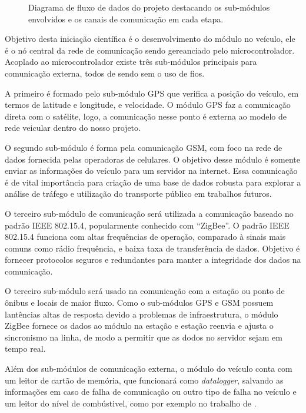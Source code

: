 \documentclass[12pt,report,2019]{uftpibic}
\begin{document}
\begin{figure}[!htpb]
\centering
\caption{Diagrama de fluxo de dados do projeto destacando os sub-módulos envolvidos e os canais de comunicação em cada etapa.}
\label{fig:projeto}
\end{figure}

Objetivo desta iniciação científica é o desenvolvimento do módulo no veículo, ele é o nó central da rede de comunicação sendo gereanciado pelo microcontrolador. Acoplado ao microcontrolador existe três sub-módulos principais para comunicação externa, todos de sendo sem o uso de fios. 

A primeiro é formado pelo sub-módulo GPS que verifica a posição do veículo, em termos de latitude e longitude, e velocidade. O módulo GPS faz a comunicação direta com o satélite, logo, a comunicação nesse ponto é externa ao modelo de rede veicular dentro do nosso projeto. 

O segundo sub-módulo é forma pela comunicação GSM, com foco na rede de dados fornecida pelas operadoras de celulares. O objetivo desse módulo é somente enviar as informações do veículo para um servidor na internet. Essa comunicação é de vital importância para criação de uma base de dados robusta para explorar a análise de tráfego e utilização do transporte público em trabalhos futuros.

O terceiro sub-módulo de comunicação será utilizada a comunicação baseado no padrão IEEE 802.15.4, popularmente conhecido com ``ZigBee''. O padrão IEEE 802.15.4 funciona com altas frequências de operação, comparado à sinais mais comuns como rádio frequência, e baixa taxa de transferência de dados. Objetivo é fornecer protocolos seguros e redundantes para manter a integridade dos dados na comunicação. 

O terceiro sub-módulo será usado na comunicação com a estação ou ponto de ônibus e locais de maior fluxo. Como o sub-módulos GPS e GSM possuem lantências altas de resposta devido a problemas de infraestrutura, o módulo ZigBee fornece os dados ao módulo na estação e estação reenvia e ajusta o sincronismo na linha, de modo a permitir que as dodos no servidor sejam em tempo real.

Além dos sub-módulos de comunicação externa, o módulo do veículo conta com um leitor de cartão de memória, que funcionará como \textit{datalogger}, salvando as informações em caso de falha de comunicação ou outro tipo de falha no veículo e um leitor do nível de combústivel, como por exemplo no trabalho de . 
\end{document}
